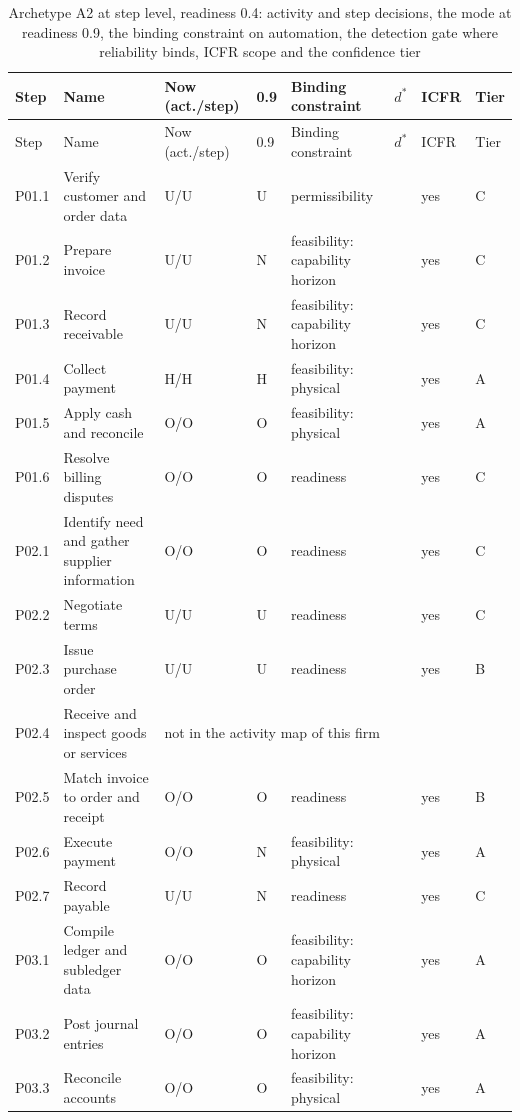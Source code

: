 \begingroup\scriptsize
\setlength{\tabcolsep}{3pt}
\begin{longtable}{@{}lp{4.4cm}llp{4.2cm}rll@{}}
\caption{Archetype A2 at step level, readiness 0.4: activity and step decisions, the mode at readiness 0.9, the binding constraint on automation, the detection gate where reliability binds, ICFR scope and the confidence tier}\label{tab:playbook-steps}\\
\toprule
Step & Name & Now (act./step) & 0.9 & Binding constraint & $d^*$ & ICFR & Tier\\
\midrule
\endfirsthead
\toprule
Step & Name & Now (act./step) & 0.9 & Binding constraint & $d^*$ & ICFR & Tier\\
\midrule
\endhead
\bottomrule
\endfoot
P01.1 & Verify customer and order data & U/U & U & permissibility &  & yes & C \\
P01.2 & Prepare invoice & U/U & N & feasibility: capability horizon &  & yes & C \\
P01.3 & Record receivable & U/U & N & feasibility: capability horizon &  & yes & C \\
P01.4 & Collect payment & H/H & H & feasibility: physical &  & yes & A \\
P01.5 & Apply cash and reconcile & O/O & O & feasibility: physical &  & yes & A \\
P01.6 & Resolve billing disputes & O/O & O & readiness &  & yes & C \\
P02.1 & Identify need and gather supplier information & O/O & O & readiness &  & yes & C \\
P02.2 & Negotiate terms & U/U & U & readiness &  & yes & C \\
P02.3 & Issue purchase order & U/U & U & readiness &  & yes & B \\
P02.4 & Receive and inspect goods or services & \multicolumn{6}{l}{not in the activity map of this firm} \\
P02.5 & Match invoice to order and receipt & O/O & O & readiness &  & yes & B \\
P02.6 & Execute payment & O/O & N & feasibility: physical &  & yes & A \\
P02.7 & Record payable & U/U & N & readiness &  & yes & C \\
P03.1 & Compile ledger and subledger data & O/O & O & feasibility: capability horizon &  & yes & A \\
P03.2 & Post journal entries & O/O & O & feasibility: capability horizon &  & yes & A \\
P03.3 & Reconcile accounts & O/O & O & feasibility: physical &  & yes & A \\

\end{longtable}
